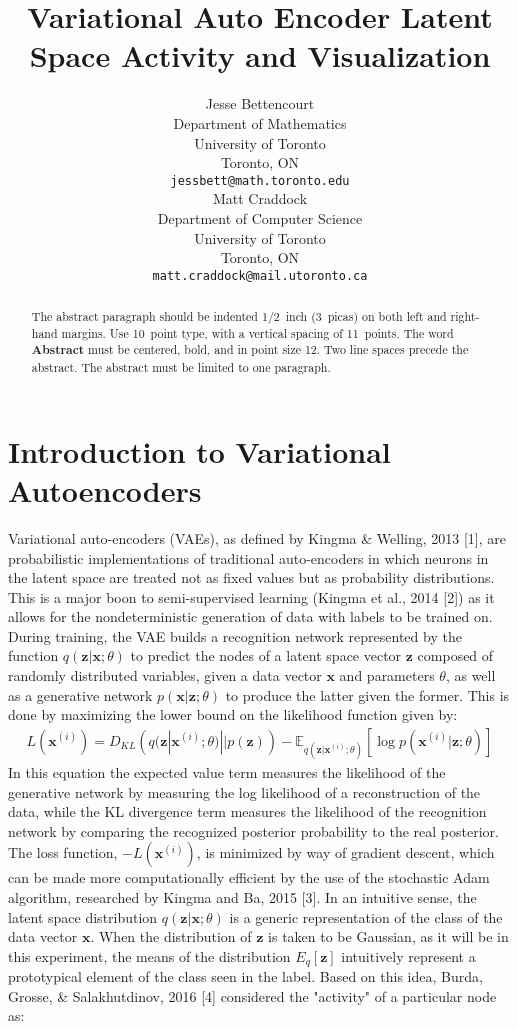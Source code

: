 \documentclass{article} %
\title{Variational Auto Encoder Latent Space Activity and Visualization}
\author{
Jesse Bettencourt\\
Department of Mathematics\\
University of Toronto\\
Toronto, ON \\
\texttt{jessbett@math.toronto.edu} \\
\And
Matt Craddock\\
Department of Computer Science\\
University of Toronto\\
Toronto, ON \\
\texttt{matt.craddock@mail.utoronto.ca} \\
}
\begin{document}
\maketitle

\begin{abstract}
The abstract paragraph should be indented 1/2~inch (3~picas) on both left and
right-hand margins. Use 10~point type, with a vertical spacing of 11~points.
The word \textbf{Abstract} must be centered, bold, and in point size 12. Two
line spaces precede the abstract. The abstract must be limited to one
paragraph.
\end{abstract}

\section{Introduction to Variational Autoencoders}
Variational auto-encoders (VAEs), as defined by Kingma \& Welling, 2013 [1], are probabilistic implementations of traditional auto-encoders in which neurons in the latent space are treated not as fixed values but as probability distributions. This is a major boon to semi-supervised learning (Kingma et al., 2014 [2]) as it allows for the nondeterministic generation of data with labels to be trained on. During training, the VAE builds a recognition network represented by the function $q(\textbf{z}|\textbf{x};\theta)$ to predict the nodes of a latent space vector $\textbf{z}$ composed of randomly distributed variables, given a data vector $\textbf{x}$ and parameters $\theta$, as well as a generative network $p(\textbf{x}|\textbf{z};\theta)$ to produce the latter given the former. This is done by maximizing the lower bound on the likelihood function given by:
\begin{align}
  L(\textbf{x}^{(i)})=D_{KL}\left(q(\textbf{z}|\textbf{x}^{(i)};\theta)||p(\textbf{z})\right)-\mathbb{E}_{q(\textbf{z}|\textbf{x}^{(i)};\theta)}\left[\log{p(\textbf{x}^{(i)}|\textbf{z};\theta)}\right]
\end{align}
In this equation the expected value term measures the likelihood of the generative network by measuring the log likelihood of a reconstruction of the data, while the KL divergence term measures the likelihood of the recognition network by comparing the recognized posterior probability to the real posterior. The loss function, $-L(\textbf{x}^{(i)})$, is minimized by way of gradient descent, which can be made more computationally efficient by the use of the stochastic Adam algorithm, researched by Kingma and Ba, 2015 [3].
In an intuitive sense, the latent space distribution $q(\textbf{z}|\textbf{x};\theta)$ is a generic representation of the class of the data vector $\textbf{x}$. When the distribution of $\textbf{z}$ is taken to be Gaussian, as it will be in this experiment, the means of the distribution $E_{q}\left[\textbf{z}\right]$ intuitively represent a prototypical element of the class seen in the label. Based on this idea, Burda, Grosse, \& Salakhutdinov, 2016 [4] considered the "activity" of a particular node as:
\end{document}
